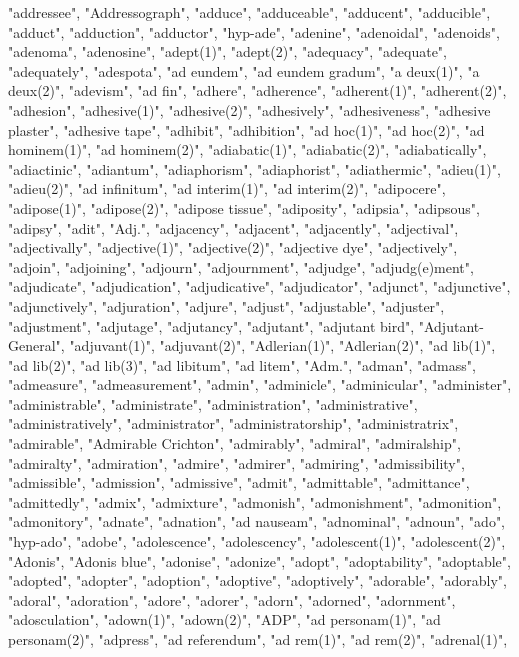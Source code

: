 "addressee",
"Addressograph",
"adduce",
"adduceable",
"adducent",
"adducible",
"adduct",
"adduction",
"adductor",
"hyp-ade",
"adenine",
"adenoidal",
"adenoids",
"adenoma",
"adenosine",
"adept(1)",
"adept(2)",
"adequacy",
"adequate",
"adequately",
"adespota",
"ad eundem",
"ad eundem gradum",
"a deux(1)",
"a deux(2)",
"adevism",
"ad fin",
"adhere",
"adherence",
"adherent(1)",
"adherent(2)",
"adhesion",
"adhesive(1)",
"adhesive(2)",
"adhesively",
"adhesiveness",
"adhesive plaster",
"adhesive tape",
"adhibit",
"adhibition",
"ad hoc(1)",
"ad hoc(2)",
"ad hominem(1)",
"ad hominem(2)",
"adiabatic(1)",
"adiabatic(2)",
"adiabatically",
"adiactinic",
"adiantum",
"adiaphorism",
"adiaphorist",
"adiathermic",
"adieu(1)",
"adieu(2)",
"ad infinitum",
"ad interim(1)",
"ad interim(2)",
"adipocere",
"adipose(1)",
"adipose(2)",
"adipose tissue",
"adiposity",
"adipsia",
"adipsous",
"adipsy",
"adit",
"Adj.",
"adjacency",
"adjacent",
"adjacently",
"adjectival",
"adjectivally",
"adjective(1)",
"adjective(2)",
"adjective dye",
"adjectively",
"adjoin",
"adjoining",
"adjourn",
"adjournment",
"adjudge",
"adjudg(e)ment",
"adjudicate",
"adjudication",
"adjudicative",
"adjudicator",
"adjunct",
"adjunctive",
"adjunctively",
"adjuration",
"adjure",
"adjust",
"adjustable",
"adjuster",
"adjustment",
"adjutage",
"adjutancy",
"adjutant",
"adjutant bird",
"Adjutant-General",
"adjuvant(1)",
"adjuvant(2)",
"Adlerian(1)",
"Adlerian(2)",
"ad lib(1)",
"ad lib(2)",
"ad lib(3)",
"ad libitum",
"ad litem",
"Adm.",
"adman",
"admass",
"admeasure",
"admeasurement",
"admin",
"adminicle",
"adminicular",
"administer",
"administrable",
"administrate",
"administration",
"administrative",
"administratively",
"administrator",
"administratorship",
"administratrix",
"admirable",
"Admirable Crichton",
"admirably",
"admiral",
"admiralship",
"admiralty",
"admiration",
"admire",
"admirer",
"admiring",
"admissibility",
"admissible",
"admission",
"admissive",
"admit",
"admittable",
"admittance",
"admittedly",
"admix",
"admixture",
"admonish",
"admonishment",
"admonition",
"admonitory",
"adnate",
"adnation",
"ad nauseam",
"adnominal",
"adnoun",
"ado",
"hyp-ado",
"adobe",
"adolescence",
"adolescency",
"adolescent(1)",
"adolescent(2)",
"Adonis",
"Adonis blue",
"adonise",
"adonize",
"adopt",
"adoptability",
"adoptable",
"adopted",
"adopter",
"adoption",
"adoptive",
"adoptively",
"adorable",
"adorably",
"adoral",
"adoration",
"adore",
"adorer",
"adorn",
"adorned",
"adornment",
"adosculation",
"adown(1)",
"adown(2)",
"ADP",
"ad personam(1)",
"ad personam(2)",
"adpress",
"ad referendum",
"ad rem(1)",
"ad rem(2)",
"adrenal(1)",
